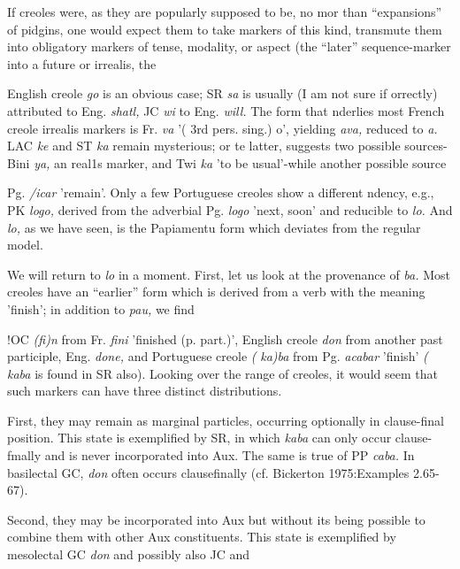 If creoles were, as they are popularly supposed to be, no mor than ``expansions'' of pidgins, one would expect them to take markers of this kind, transmute them into obligatory markers of tense, modal\-ity, or aspect (the ``later'' sequence-marker into a future or irrealis, the

English creole \textit{go} is an obvious case; SR \textit{sa} is usually (I am not sure if orrectly) attributed to Eng. \textit{shatl,} JC \textit{wi} to Eng. \textit{will.} The form that nderlies most French creole irrealis markers is Fr. \textit{va} '( 3rd pers. sing.) o', yielding \textit{ava,} reduced to \textit{a.} LAC \textit{k}\textit{e} and ST \textit{k}\textit{a} remain mysterious; or te latter, \citet{Ferraz1979} suggests two possible sources-Bini \textit{ya,} an real1s marker, and Twi \textit{ka} 'to be usual'-while another possible source

Pg. \textit{/icar }'remain'. Only a few Portuguese creoles show a different ndency, e.g., PK \textit{logo, }derived from the adverbial Pg. \textit{logo }'next,
soon' and reducible to \textit{lo.} And \textit{lo,} as we have seen, is the Papiamentu form which deviates from the regular model.

We will return to \textit{lo} in a moment. First, let us look at the prove\-nance of \textit{ba.} Most creoles have an ``earlier'' form which is derived from a verb with the meaning 'finish'; in addition to \textit{pau,} we find

!OC \textit{(}\textit{fi)n} from Fr. \textit{fini} 'finished (p. part.)', English creole \textit{don }from another past participle, Eng. \textit{done,} and Portuguese creole \textit{(} \textit{ka)ba }from Pg. \textit{acabar} 'finish' \textit{(} \textit{k}\textit{aba} is found in SR also). Looking over the range of creoles, it would seem that such markers can have three distinct distributions.

First, they may remain as marginal particles, occurring option\-ally in clause-final position. This state is exemplified by SR, in which \textit{kaba} can only occur clause-fmally and is never incorporated into Aux. The same is true of PP \textit{caba.} In basilectal GC, \textit{don} often occurs clause\-finally (cf. Bickerton 1975:Examples 2.65-67).

Second, they may be incorporated into Aux but without its being possible to combine them with other Aux constituents. This state is exemplified by mesolectal GC \textit{don} and possibly also JC and

